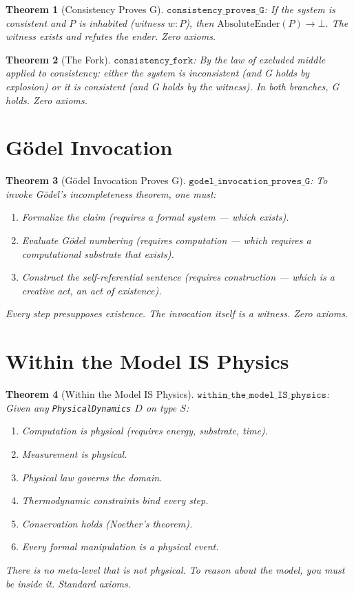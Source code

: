 \documentclass[12pt,a4paper]{article}
\newtheorem{theorem}{Theorem}[section]
\begin{document}
\begin{theorem}[Consistency Proves G]\label{thm:consistent}
$\texttt{consistency\_proves\_G}$: If the system is consistent and $P$
is inhabited (witness $w : P$), then $\text{AbsoluteEnder}(P) \to \bot$.
The witness exists and refutes the ender.
Zero axioms.
\end{theorem}

\begin{theorem}[The Fork]\label{thm:fork}
$\texttt{consistency\_fork}$: By the law of excluded middle applied to
consistency: either the system is inconsistent (and G holds by
explosion) or it is consistent (and G holds by the witness). In both
branches, G holds.
Zero axioms.
\end{theorem}

\section{G\"odel Invocation}

\begin{theorem}[G\"odel Invocation Proves G]\label{thm:invocation}
$\texttt{godel\_invocation\_proves\_G}$: To invoke G\"odel's
incompleteness theorem, one must:
\begin{enumerate}
    \item Formalize the claim (requires a formal system --- which exists).
    \item Evaluate G\"odel numbering (requires computation --- which requires
    a computational substrate that exists).
    \item Construct the self-referential sentence (requires construction ---
    which is a creative act, an act of existence).
\end{enumerate}
Every step presupposes existence. The invocation itself is a witness.
Zero axioms.
\end{theorem}

\section{Within the Model IS Physics}

\begin{theorem}[Within the Model IS Physics]\label{thm:within}
$\texttt{within\_the\_model\_IS\_physics}$: Given any
\texttt{PhysicalDynamics} $D$ on type $S$:
\begin{enumerate}
    \item Computation is physical (requires energy, substrate, time).
    \item Measurement is physical.
    \item Physical law governs the domain.
    \item Thermodynamic constraints bind every step.
    \item Conservation holds (Noether's theorem).
    \item Every formal manipulation is a physical event.
\end{enumerate}
There is no meta-level that is not physical. To reason about the model,
you must be inside it. Standard axioms.
\end{theorem}
\end{document}
